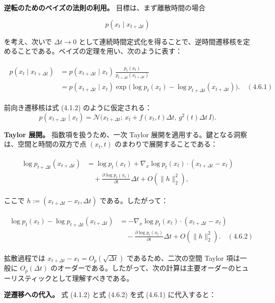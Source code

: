 \textbf{逆転のためのベイズの法則の利用。} 目標は、まず離散時間の場合

\[
p(x_t\mid x_{t+\Delta t})
\]


を考え、次いで $\Delta t\to 0$ として連続時間定式化を得ることで、逆時間遷移核を定めることである。ベイズの定理を用い、次のように表す：

\begin{align*}
\begin{aligned}
p(x_t\mid x_{t+\Delta t})
&= p(x_{t+\Delta t}\mid x_t)\,\frac{p_t(x_t)}{p_{t+\Delta t}(x_{t+\Delta t})} \\
&= p(x_{t+\Delta t}\mid x_t)
\exp\bigl(\log p_t(x_t)-\log p_{t+\Delta t}(x_{t+\Delta t})\bigr). \quad (4.6.1)
\end{aligned}
\end{align*}


前向き遷移核は式 (4.1.2) のように仮定される：
\[
p(x_{t+\Delta t}\mid x_t)=\mathcal{N}\bigl(x_{t+\Delta t};\, x_t+f(x_t,t)\Delta t,\, g^2(t)\Delta t\, I\bigr).
\]


\textbf{Taylor 展開。} 指数項を扱うため、一次 Taylor 展開を適用する。鍵となる洞察は、空間と時間の双方で点 $(x_t,t)$ のまわりで展開することである：

\begin{align*}
\begin{aligned}
\log p_{t+\Delta t}(x_{t+\Delta t})
&= \log p_t(x_t)
+ \nabla_x\log p_t(x_t)\cdot(x_{t+\Delta t}-x_t) \\
&\quad + \frac{\partial\log p_t(x_t)}{\partial t}\Delta t
+ O(\|h\|_2^2),
\end{aligned}
\end{align*}


ここで $h:=(x_{t+\Delta t}-x_t,\Delta t)$ である。したがって：

\begin{align*}
\begin{aligned}
\log p_t(x_t)-\log p_{t+\Delta t}(x_{t+\Delta t})
&= -\nabla_x\log p_t(x_t)\cdot(x_{t+\Delta t}-x_t) \\
&\quad - \frac{\partial\log p_t(x_t)}{\partial t}\Delta t
+ O(\|h\|_2^2). \quad (4.6.2)
\end{aligned}
\end{align*}


拡散過程では $x_{t+\Delta t}-x_t=O_p(\sqrt{\Delta t})$ であるため、二次の空間 Taylor 項は一般に $O_p(\Delta t)$ のオーダーである。したがって、次の計算は主要オーダーのヒューリスティックとして理解すべきである。

\textbf{逆遷移への代入。} 式 (4.1.2) と式 (4.6.2) を式 (4.6.1) に代入すると：

